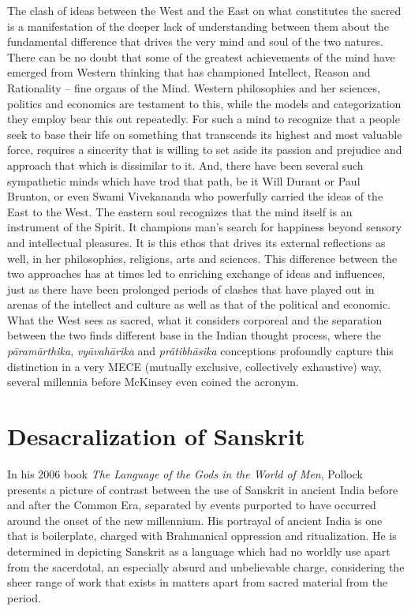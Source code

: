 The clash of ideas between the West and the East on what constitutes the sacred is a manifestation of the deeper lack of understanding between them about the fundamental difference that drives the very mind and soul of the two natures. There can be no doubt that some of the greatest achievements of the mind have emerged from Western thinking that has championed Intellect, Reason and Rationality – fine organs of the Mind. Western philosophies and her sciences, politics and economics are testament to this, while the models and categorization they employ bear this out repeatedly. For such a mind to recognize that a people seek to base their life on something that transcends its highest and most valuable force, requires a sincerity that is willing to set aside its passion and prejudice and approach that which is dissimilar to it. And, there have been several such sympathetic minds which have trod that path, be it Will Durant or Paul Brunton, or even Swami Vivekananda who powerfully carried the ideas of the East to the West. The eastern soul recognizes that the mind itself is an instrument of the Spirit. It champions man’s search for happiness beyond sensory and intellectual pleasures. It is this ethos that drives its external reflections as well, in her philosophies, religions, arts and sciences. This difference between the two approaches has at times led to enriching exchange of ideas and influences, just as there have been prolonged periods of clashes that have played out in arenas of the intellect and culture as well as that of the political and economic. What the West sees as sacred, what it considers corporeal and the separation between the two finds different base in the Indian thought process, where the \textit{pāramārthika}, \textit{vyāvahārika} and \textit{prātibhāsika} conceptions profoundly capture this distinction in a very MECE (mutually exclusive, collectively exhaustive) way, several millennia before McKinsey even coined the acronym.


\section{Desacralization of Sanskrit}

In his 2006 book \textit{The Language of the Gods in the World of Men}, Pollock presents a picture of contrast between the use of Sanskrit in ancient India before and after the Common Era, separated by events purported to have occurred around the onset of the new millennium. His portrayal of ancient India is one that is boilerplate, charged with Brahmanical oppression and ritualization. He is determined in depicting Sanskrit as a language which had no worldly use apart from the sacerdotal, an especially absurd and unbelievable charge, considering the sheer range of work that exists in matters apart from sacred material from the period.

